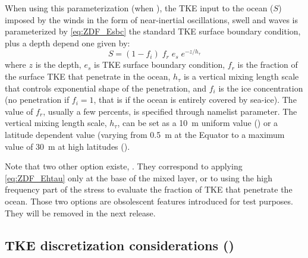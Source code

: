 \documentclass[../main/NEMO_manual]{subfiles}
\begin{document}
When using this parameterization (\ie when ),
the TKE input to the ocean ($S$) imposed by the winds in the form of near-inertial oscillations,
swell and waves is parameterized by \autoref{eq:ZDF_Esbc} the standard TKE surface boundary condition,
plus a depth depend one given by:
\begin{equation}
  \label{eq:ZDF_Ehtau}
  S = (1-f_i) \; f_r \; e_s \; e^{-z / h_\tau}
\end{equation}
where $z$ is the depth, $e_s$ is TKE surface boundary condition, $f_r$ is the fraction of the surface TKE that
penetrate in the ocean, $h_\tau$ is a vertical mixing length scale that controls exponential shape of
the penetration, and $f_i$ is the ice concentration
(no penetration if $f_i=1$, that is if the ocean is entirely covered by sea-ice).
The value of $f_r$, usually a few percents, is specified through  namelist parameter.
The vertical mixing length scale, $h_\tau$, can be set as a 10~m uniform value () or
a latitude dependent value (varying from 0.5~m at the Equator to a maximum value of 30~m at high latitudes
(). 

Note that two other option existe, .
They correspond to applying \autoref{eq:ZDF_Ehtau} only at the base of the mixed layer,
or to using the high frequency part of the stress to evaluate the fraction of TKE that penetrate the ocean. 
Those two options are obsolescent features introduced for test purposes.
They will be removed in the next release. 


\subsection{TKE discretization considerations (\protect{})}
\label{subsec:ZDF_tke_ene}
\end{document}
